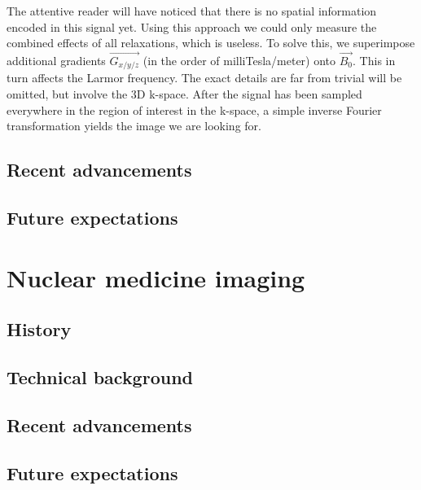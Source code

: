 The attentive reader will have noticed that there is no spatial information
encoded in this signal yet. Using this approach we could only measure the
combined effects of all relaxations, which is useless. To solve this, we
superimpose additional gradients $\vec{G_{x/y/z}}$ (in the order of
milliTesla/meter) onto $\vec{B_0}$. This in turn affects the Larmor frequency.
The exact details are far from trivial will be omitted, but involve the
3D k-space. After the signal has been sampled everywhere in the region of
interest in the k-space, a simple inverse Fourier transformation yields the
image we are looking for.


\subsection{Recent advancements}

\subsection{Future expectations}

\section{Nuclear medicine imaging}

\subsection{History}

\subsection{Technical background}

\subsection{Recent advancements}

\subsection{Future expectations}


